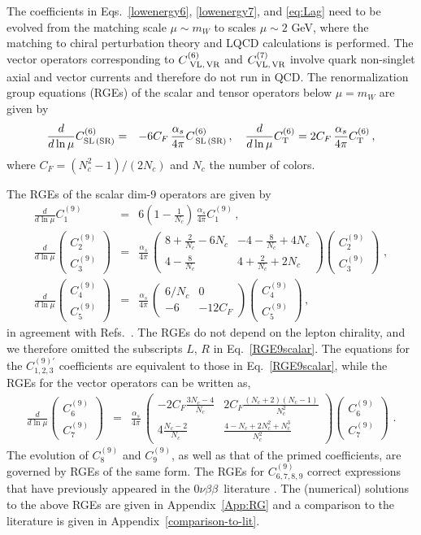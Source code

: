 \documentclass[letterpaper,11pt]{article}
\newcommand{\al}{\alpha}
\newcommand{\bea}{\begin{eqnarray}}
\newcommand{\eea}{\end{eqnarray}}
\newcommand{\bma}{\begin{pmatrix}}
\newcommand{\ema}{\end{pmatrix}}
\newcommand{\sq}{^{2}}
\newcommand{\nn}{\nonumber}
\newcommand{\NLDBD}{$0 \nu \beta \beta$}
\begin{document}
The coefficients in Eqs.\ \eqref{lowenergy6}, \eqref{lowenergy7}, and \eqref{eq:Lag} need to be evolved from the matching scale $\mu \sim m_W$ to scales $\mu \sim 2$ GeV, where the matching to chiral perturbation theory and LQCD calculations is performed. The vector operators corresponding to  $C^{(6)}_{\textrm{ VL,\,VR}}$ and $C^{(7)}_{\textrm{VL,\,VR}}$ 
involve quark non-singlet axial and vector currents and therefore do not run in QCD.
The renormalization group equations (RGEs) of the scalar and tensor operators below $\mu=m_W$ are given by
\bea\label{RGE6}
\frac{d}{d\ln \mu} C^{(6)}_{\textrm{SL\,(SR)}} &=& -6 C_F\, \frac{\al_s}{4\pi}  C^{(6)}_{\, \textrm{SL\,(SR)}}\,,\quad
\frac{d}{d\ln \mu}  C^{(6)}_{\textrm T} = 2 C_F\, \frac{\al_s}{4\pi} C^{(6)}_{\textrm T}\,,
\eea
where $C_F=(N_c\sq-1)/(2N_c)$ and $N_c$ the number of colors.

The RGEs of the scalar dim-9 operators are given by
\bea\label{RGE9scalar}
\frac{d}{d\ln \mu} C^{(9)}_{1} &=& 6\left(1-\frac{1}{N_c}\right)\, \frac{\al_s}{4\pi}  C^{(9)}_{1}\,,\nn\\
\frac{d}{d\ln \mu}  \bma C^{(9)}_{2}\\C^{(9)}_{3}\ema  &=&  \frac{\al_s}{4\pi}\,\bma 8 + \frac{2}{N_c} - 6 N_c & -4 - \frac{8}{N_c} + 4 N_c \\4 - \frac{8}{N_c} &4 + \frac{2}{N_c} + 2 N_c \ema \bma C^{(9)}_{2}\\C^{(9)}_{3}\ema\, \,,\nn\\
\frac{d}{d\ln \mu}  \bma C^{(9)}_{4}\\C^{(9)}_{5}\ema  &=&  \frac{\al_s}{4\pi}\,\bma 6/N_c&0\\-6&-12 C_F\ema \bma C^{(9)}_{4}\\C^{(9)}_{5}\ema\,,
\eea
 in agreement with Refs.~\cite{Buras:2000if,Buras:2001ra}.
The RGEs do not depend on the lepton chirality, and we therefore omitted the subscripts $L$, $R$ in Eq.\ \eqref{RGE9scalar}.
The equations for the $C^{(9)\prime}_{1,2,3}$ coefficients are equivalent to those in Eq.~\eqref{RGE9scalar}, while the RGEs for the vector operators can be written as,
\bea\label{RGE9vector}
\frac{d}{d\ln \mu}  \bma C^{(9)}_{6}\\C^{(9)}_{7}\ema  &=&  \frac{\al_s}{4\pi}\,\bma - 2 C_F \frac{3 N_c -4}{N_c} &  2C_F\frac{(N_c+2)(N_c-1)}{N_c\sq} \\ 
4 \frac{N_c -2}{N_c}&  \frac{4 -  N_c + 2 N_c^2 + N_c^3}{N_c^2} \ema \bma C^{(9)}_{6}\\C^{(9)}_{7}\ema\, \,.
\eea
The evolution of $C^{(9)}_{8}$ and $C_{9}^{(9)}$, as well as that of the primed coefficients, are governed by RGEs of the same form. 
The RGEs for $C_{6,7,8,9}^{(9)}$ correct expressions that have previously appeared in the \NLDBD\ literature \cite{Gonzalez:2015ady}. 
The (numerical) solutions to the above RGEs are given in Appendix~\ref{App:RG} and a comparison to the literature is given in Appendix~\ref{comparison-to-lit}. 
\end{document}
